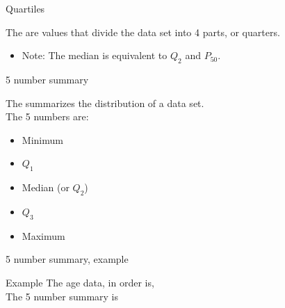 \documentclass[xcolor=table, aspectratio=169, bigger, handout]{beamer}
\begin{document}
\begin{frame}{Quartiles}
\begin{block}{}
The  are values that divide the data set into 4 parts, or quarters.\\
\smallskip
{}
\begin{itemize}
\pause
\item Note: The median is equivalent to $Q_2$ and $P_{50}$.
\end{itemize}
\end{block}
\end{frame}

\begin{frame}{5 number summary}
\begin{block}{}
The  summarizes the distribution of a data set.\\
\medskip
The 5 numbers are:
\begin{itemize}
\item Minimum
\item $Q_1$
\item Median (or $Q_2$)
\item $Q_3$
\item Maximum
\end{itemize}
\end{block}
\end{frame}

\begin{frame}{5 number summary, example}
\begin{exampleblock}{Example}
The age data, in order is, \\ \smallskip
{}
\medskip
The 5 number summary is\\ \smallskip
{}
\end{exampleblock}
\end{frame}
\end{document}
